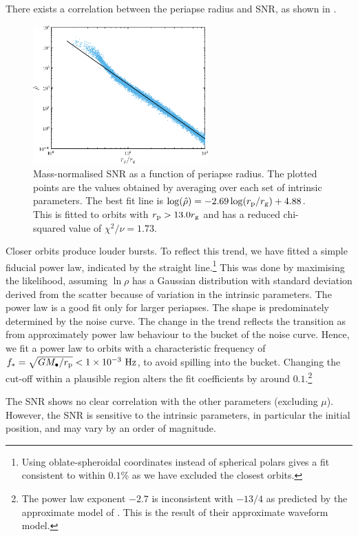 There exists a correlation between the periapse radius and SNR, as shown in .
\begin{figure}[!htp]
  \begin{center}
  \includegraphics[width=0.6\textwidth]{./images/Fig_SNR}
    \caption{Mass-normalised SNR as a function of periapse radius. The plotted points are the values obtained by averaging over each set of intrinsic parameters. The best fit line is $\log(\hat{\rho}) = -2.69\log(r_\mathrm{p}/r_\mathrm{g}) + 4.88$. This is fitted to orbits with $r_\mathrm{p} >  13.0 r_\mathrm{g}$ and has a reduced chi-squared value of $\chi^2/\nu = 1.73$.\label{fig:SNR}}
  \end{center}
\end{figure}
Closer orbits produce louder bursts. To reflect this trend, we have fitted a simple fiducial power law, indicated by the straight line.\footnote{Using oblate-spheroidal coordinates instead of spherical polars gives a fit consistent to within $0.1\%$ as we have excluded the closest orbits.} This was done by maximising the likelihood, assuming $\ln \rho$ has a Gaussian distribution with standard deviation derived from the scatter because of variation in the intrinsic parameters. The power law is a good fit only for larger periapses. The shape is predominately determined by the noise curve. The change in the trend reflects the transition as from approximately power law behaviour to the bucket of the noise curve. Hence, we fit a power law to orbits with a characteristic frequency of $f_\ast = \sqrt{GM_\bullet/r_\mathrm{p}} < 1 \times 10^{-3}~\mathrm{Hz}$, to avoid spilling into the bucket. Changing the cut-off within a plausible region alters the fit coefficients by around $0.1$.\footnote{The power law exponent $-2.7$ is inconsistent with $-13/4$ as predicted by the approximate model of \citet{Hopman2007}. This is the result of their approximate waveform model.}

The SNR shows no clear correlation with the other parameters (excluding $\mu$). However, the SNR is sensitive to the intrinsic parameters, in particular the initial position, and may vary by an order of magnitude.

